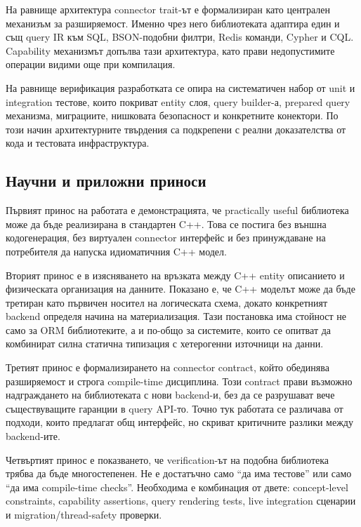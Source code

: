 На равнище архитектура connector trait-ът е формализиран като централен механизъм за разширяемост. Именно чрез него библиотеката адаптира един и същ query IR към SQL, BSON-подобни филтри, Redis команди, Cypher и CQL. Capability механизмът допълва тази архитектура, като прави недопустимите операции видими още при компилация.

На равнище верификация разработката се опира на систематичен набор от unit и integration тестове, които покриват entity слоя, query builder-а, prepared query механизма, миграциите, нишковата безопасност и конкретните конектори. По този начин архитектурните твърдения са подкрепени с реални доказателства от кода и тестовата инфраструктура.

\subsection{Научни и приложни приноси}

Първият принос на работата е демонстрацията, че practically useful \ORMName{} библиотека може да бъде реализирана в стандартен C++. Това се постига без външна кодогенерация, без виртуален connector интерфейс и без принуждаване на потребителя да напуска идиоматичния C++ модел.

Вторият принос е в изясняването на връзката между C++ entity описанието и физическата организация на данните. Показано е, че C++ моделът може да бъде третиран като първичен носител на логическата схема, докато конкретният backend определя начина на материализация. Тази постановка има стойност не само за ORM библиотеките, а и по-общо за системите, които се опитват да комбинират силна статична типизация с хетерогенни източници на данни.

Третият принос е формализирането на connector contract, който обединява разширяемост и строга compile-time дисциплина. Този contract прави възможно надграждането на библиотеката с нови backend-и, без да се разрушават вече съществуващите гаранции в query API-то. Точно тук работата се различава от подходи, които предлагат общ интерфейс, но скриват критичните разлики между backend-ите.

Четвъртият принос е показването, че verification-ът на подобна библиотека трябва да бъде многостепенен. Не е достатъчно само ``да има тестове'' или само ``да има compile-time checks''. Необходима е комбинация от двете: concept-level constraints, capability assertions, query rendering tests, live integration сценарии и migration/thread-safety проверки.


